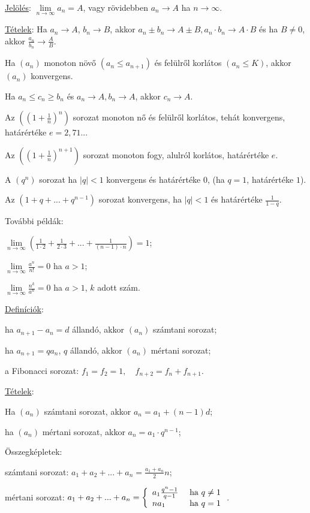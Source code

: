 \documentclass{article}
\begin{document}
\noindent\underline{Jelölés}: $\lim\limits_{n\to\infty} a_n=A$, vagy rövidebben $a_n\to A$ ha $n\to\infty$.

\noindent\underline{Tételek}: 
Ha $a_n\to A$, $b_n\to B$, akkor $a_n\pm b_n\to A\pm B, a_n\cdot b_n\to A\cdot B$ és ha $B\not=0$, akkor $\frac{a_n}{b_n}\to\frac{A}{B}$.


Ha $(a_n)$ monoton növő $(a_n\leq a_{n+1})$ és felülről korlátos $(a_n\leq K)$, akkor $(a_n)$ konvergens.

Ha $a_n\leq c_n\geq b_n$ és $a_n\to A, b_n\to A$, akkor $c_n\to A$.

Az $\left(\left(1+\frac{1}{n}\right)^n\right)$ sorozat monoton nő és felülről korlátos, tehát konvergens, határértéke $e=2{,}71...$

Az $\left(\left(1+\frac{1}{n}\right)^{n+1}\right)$ sorozat monoton fogy, alulról korlátos, határértéke $e$.

A $(q^n)$ sorozat ha $|q|<1$ konvergens és határértéke $0$, (ha $q=1$, határértéke $1$).

Az $(1+q+...+q^{n-1})$ sorozat konvergens, ha $|q|<1$ és határértéke $\frac{1}{1-q}$.

\noindent További példák:

$\lim\limits_{n\to\infty} \left(\frac{1}{1\cdot 2}+\frac{1}{2\cdot 3}+...+\frac{1}{(n-1)\cdot n}\right)=1$;

$\lim\limits_{n\to\infty} \frac{a^n}{n!}=0$ ha $a>1$;

$\lim\limits_{n\to\infty} \frac{n^k}{a^n}=0$ ha $a>1$, $k$ adott szám.

\noindent\underline{Definíciók}:

ha $a_{n+1}-a_n=d$ állandó, akkor $(a_n)$ számtani sorozat;

ha $a_{n+1}=qa_n$, $q$ állandó, akkor $(a_n)$ mértani sorozat;

a Fibonacci sorozat:
$f_1=f_2=1,\quad f_{n+2}=f_n+f_{n+1}$.

\noindent\underline{Tételek}:

Ha $(a_n)$ számtani sorozat, akkor $a_n=a_1+(n-1)d$;

ha $(a_n)$ mértani sorozat, akkor $a_n=a_1\cdot q^{n-1}$;

Összegképletek:

számtani sorozat: $a_1+a_2+...+a_n=\frac{a_1+a_n}{2}n$;

mértani sorozat: $a_1+a_2+...+a_n=
\left\{
\begin{array}{lr} 
a_1\frac{q^n-1}{q-1} &\text{~ha~} q\ne 1\cr 
na_1 &\text{~ha~} q=1
\end{array}
\right.$. 
\end{document}
